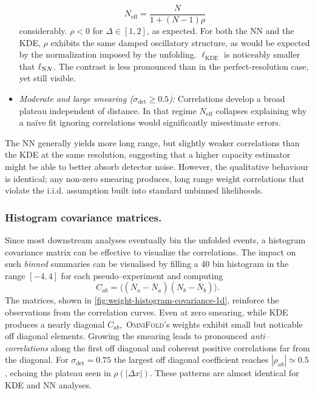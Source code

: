 \begin{itemize}
\[                  N_{\text{eff}} = \frac{N}{1+(N-1)\rho}
                  \]
                  considerably.
                  \(\rho < 0\) for \(\Delta \in [1, 2]\), as expected.
                  For both the NN and the KDE, \(\rho\) exhibits the same damped oscillatory structure, as would be expected by the normalization imposed by the unfolding.
                  \(\ell_{\text{KDE}}\) is noticeably smaller that \(\ell_{\text NN}\).
                  The contrast is less pronounced than in the perfect-resolution case, yet still visible.
            \item \emph{Moderate and large smearing ($\sigma_{\det}\ge0.5$):}
                Correlations develop a broad plateau {independent of distance}.
                In that regime $N_\text{eff}$ collapses explaining why a naïve fit ignoring  correlations would significantly misestimate errors.
            \end{itemize}
            The \textsc{NN} generally yields more long range, but {slightly weaker} correlations than the \textsc{KDE} at the same resolution, suggesting that a higher capacity estimator might be able to better absorb detector noise. 
            However, the qualitative behaviour is identical;
            any non-zero smearing produces, long range weight correlations that violate the i.i.d. assumption built into standard unbinned likelihoods.
        \subsubsection{Histogram covariance matrices.}
            Since most downstream analyses eventually bin the unfolded events, a histogram covariance matrix can be effective to visualize the correlations.
            The impact on such \emph{binned} summaries can be visualised by filling a 40 bin histogram in the range $[-4,4]$ for each pseudo--experiment and computing
            \[
              C_{ab} = \bigl\langle
                         (N_a-\bar N_a)(N_b-\bar N_b)
                       \bigr\rangle.
            \]
            The matrices, shown in \cref{fig:weight-histogram-covariance-1d}, reinforce the observations from the correlation curves.
            Even at zero smearing, while KDE produces a nearly diagonal $C_{ab},$ \textsc{OmniFold}'s weights exhibit small but noticable off diagonal elements.
            Growing the smearing leads to pronounced \emph{anti--correlations} along the first off diagonal and coherent positive correlations far from the diagonal.
            For $\sigma_{\det}=0.75$ the largest off diagonal coefficient reaches $|\rho_{ab}|\simeq0.5$, echoing the plateau seen in $\rho(|\Delta x|)$.  These patterns are almost identical for KDE and NN analyses.

